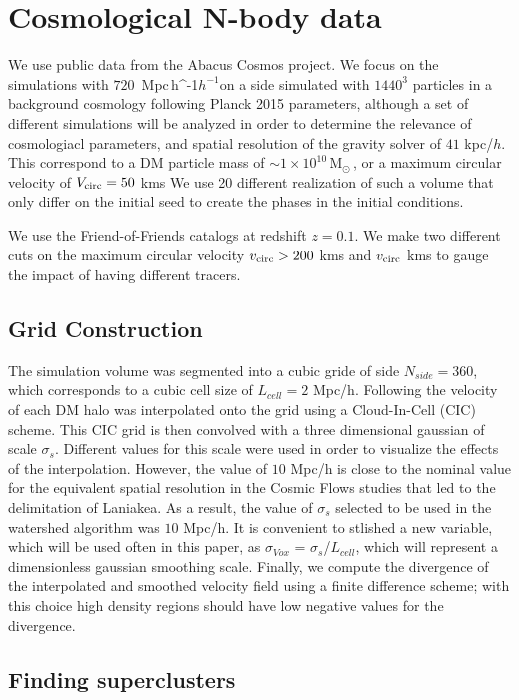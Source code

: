 \documentclass[usenatbib]{mnras}
\newcommand{\Msun}{\,{\rm M}$_{\odot}$\,}
\newcommand{\Mpch}{\,{\rm Mpc}\,\ifmmode h^{-1}\else $h^{-1}$\fi}
\begin{document}
\section{Cosmological N-body data}

We use public data from the Abacus Cosmos project. 
We focus on the simulations with $720$ \Mpch on a side simulated with $1440^3$
particles in a background cosmology following Planck 2015 parameters, although a set of different simulations will be analyzed in order to determine the relevance of cosmologiacl parameters, and spatial resolution
of the gravity solver of $41$ kpc/$h$.
This correspond to a DM particle mass of $\sim 1 \times 10^{10}$\Msun, 
or a maximum circular velocity of $V_{\rm circ}=50$ kms
We use 20 different realization of such a volume that only differ on the initial seed to create the phases in the initial conditions.

We use the Friend-of-Friends catalogs at redshift $z=0.1$.
We make two different cuts on the maximum circular velocity $v_{\rm circ}>200$ kms and $v_{\rm circ}$ kms to gauge the impact of having different tracers.


\subsection{Grid Construction}  

The simulation volume was segmented into a cubic gride of side $N_{side}=360$, 
which corresponds to a cubic cell size of $L_{cell}=2$ Mpc/h.
Following \cite{2014Natur.513...71T} the velocity of each DM halo was interpolated onto the
grid using a Cloud-In-Cell (CIC) scheme. 
This CIC grid is then convolved with a three dimensional gaussian of scale $\sigma_s$.
Different values for this scale were used in order to visualize the effects of the interpolation. However, the value of $10$ Mpc/h is close to the nominal value for the equivalent spatial resolution
in the Cosmic Flows studies that led to the delimitation of Laniakea. As a result, the value of $\sigma_s$ selected to be used in the watershed algorithm was $10$ Mpc/h. It is convenient to stlished a new variable, which will be used often in this paper, as $\sigma_{Vox}$ = $\sigma_s$/$L_{cell}$, which will represent a dimensionless gaussian smoothing scale. 
Finally, we compute the divergence of the interpolated and smoothed velocity field using a
finite difference scheme; with this choice high density regions should have low negative
values for the divergence.


\subsection{Finding superclusters}
\label{sec:INTROWatershed}
\end{document}
